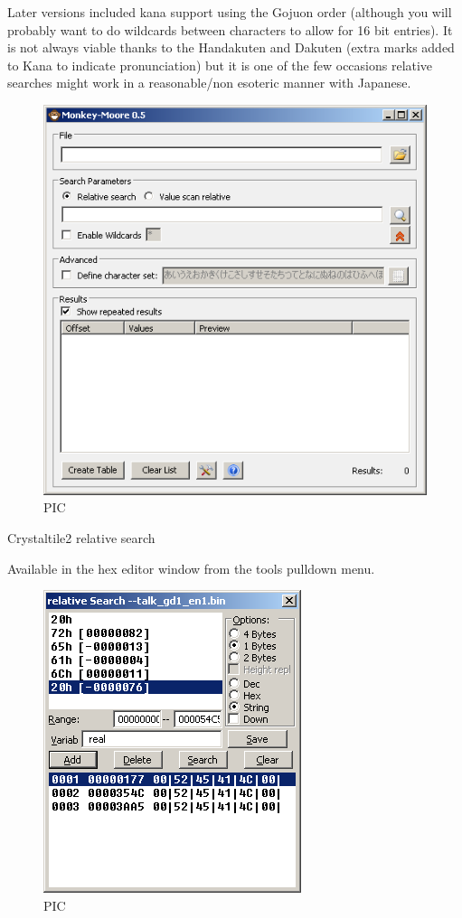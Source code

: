 \documentclass[
]{book}
\begin{document}
Later versions included kana support using the Gojuon order (although you will probably want to do wildcards between characters to allow for 16 bit entries). It is not always viable thanks to the Handakuten and Dakuten (extra marks added to Kana to indicate pronunciation) but it is one of the few occasions relative searches might work in a reasonable/non esoteric manner with Japanese.

\begin{figure}
\centering
\includegraphics{images/83_home_fast6191_romhackingguide_unrenamed_file___al_borders_romhackingguiderelativesearchmm6.png}
\caption{PIC}
\end{figure}

Crystaltile2 relative search

Available in the hex editor window from the tools pulldown menu.

\begin{figure}
\centering
\includegraphics{images/84_home_fast6191_romhackingguide_unrenamed_file___l_borders_romhackingguiderelativesearchct21.png}
\caption{PIC}
\end{figure}
\end{document}
